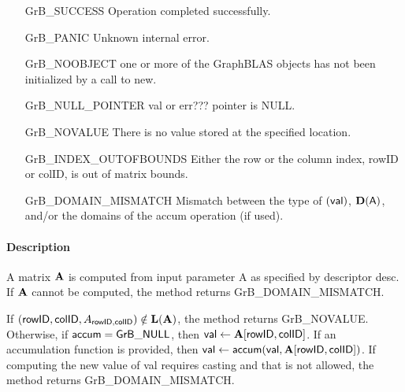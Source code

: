 \begin{itemize}[leftmargin=2.1in]
\item[{\sf GrB\_SUCCESS}]             Operation completed successfully.
\item[{\sf GrB\_PANIC}]               Unknown internal error.
\item[{\sf GrB\_NOOBJECT}]   one or more of the GraphBLAS objects has
                             not been initialized by a call to {\sf new}.
\item[{\sf GrB\_NULL\_POINTER}]    {\sf val} or {\sf err???} pointer is {\sf NULL}.
\item[{\sf GrB\_NOVALUE}]             There is no value stored at the specified location.
\item[{\sf GrB\_INDEX\_OUTOFBOUNDS}]  Either the row or the column index,
                                      {\sf rowID} or {\sf colID}, is out of matrix bounds.
\item[{\sf GrB\_DOMAIN\_MISMATCH}]    Mismatch between the type of $(\sf val)$, 
                                      $\bold{D}({\sf A})$, and/or the domains of the 
                                      {\sf accum} operation (if used).
\end{itemize}

\paragraph{Description}

A matrix ${\bf A}$ is computed from input parameter {\sf A} as specified by descriptor {\sf desc}.
If ${\bf A}$ cannot be computed, the method returns {\sf GrB\_DOMAIN\_MISMATCH}.

If $({\sf rowID},{\sf colID}, A_{{\sf rowID},{\sf colID}}) \notin \bold{L}({\bf A})$, 
the method returns {\sf GrB\_NOVALUE}.  Otherwise, if 
${\sf accum} = {\sf GrB\_NULL}$, then ${\sf val} \leftarrow {\bf A}[{\sf rowID},{\sf colID}]$.
If an accumulation function is provided, then 
${\sf val} \leftarrow {\sf accum}({\sf val},{\bf A}[{\sf rowID},{\sf colID}])$.
If computing the new value of {\sf val} requires casting and that is not allowed,
the method returns {\sf GrB\_DOMAIN\_MISMATCH}.
